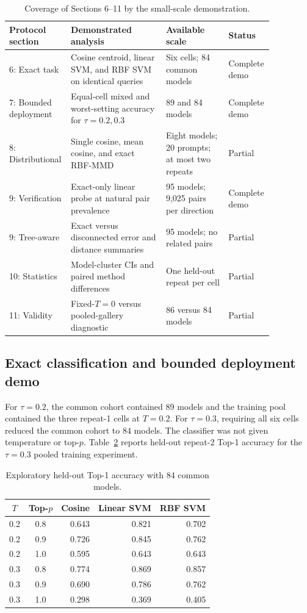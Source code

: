 \documentclass[11pt,a4paper]{article}
\begin{document}
\begin{table}[htbp]
\centering
\caption{Coverage of Sections 6--11 by the small-scale demonstration.}
\label{tab:demo-coverage}
\begin{tabular}{p{0.13\linewidth}p{0.35\linewidth}p{0.23\linewidth}p{0.15\linewidth}}
\toprule
Protocol section & Demonstrated analysis & Available scale & Status \\
\midrule
6: Exact task
  & Cosine centroid, linear SVM, and RBF SVM on identical queries
  & Six cells; 84 common models & Complete demo \\
7: Bounded deployment
  & Equal-cell mixed and worst-setting accuracy for $\tau=0.2,0.3$
  & 89 and 84 models & Complete demo \\
8: Distributional
  & Single cosine, mean cosine, and exact RBF-MMD
  & Eight models; 20 prompts; at most two repeats & Partial \\
9: Verification
  & Exact-only linear probe at natural pair prevalence
  & 95 models; 9,025 pairs per direction & Complete demo \\
9: Tree-aware
  & Exact versus disconnected error and distance summaries
  & 95 models; no related pairs & Partial \\
10: Statistics
  & Model-cluster CIs and paired method differences
  & One held-out repeat per cell & Partial \\
11: Validity
  & Fixed-$T=0$ versus pooled-gallery diagnostic
  & 86 versus 84 models & Partial \\
\bottomrule
\end{tabular}
\end{table}

\subsection{Exact classification and bounded deployment demo}

For $\tau=0.2$, the common cohort contained 89 models and the training pool
contained the three repeat-1 cells at $T=0.2$. For $\tau=0.3$, requiring all six
cells reduced the common cohort to 84 models. The classifier was not given
temperature or top-$p$. Table~\ref{tab:demo-per-setting} reports held-out
repeat-2 Top-1 accuracy for the $\tau=0.3$ pooled training experiment.

\begin{table}[ht]
\centering
\caption{Exploratory held-out Top-1 accuracy with 84 common models.}
\label{tab:demo-per-setting}
\begin{tabular}{ccrrr}
\toprule
$T$ & Top-$p$ & Cosine & Linear SVM & RBF SVM \\
\midrule
0.2 & 0.8 & 0.643 & 0.821 & 0.702 \\
0.2 & 0.9 & 0.726 & 0.845 & 0.762 \\
0.2 & 1.0 & 0.595 & 0.643 & 0.643 \\
0.3 & 0.8 & 0.774 & 0.869 & 0.857 \\
0.3 & 0.9 & 0.690 & 0.786 & 0.762 \\
0.3 & 1.0 & 0.298 & 0.369 & 0.405 \\
\bottomrule
\end{tabular}
\end{table}
\end{document}
